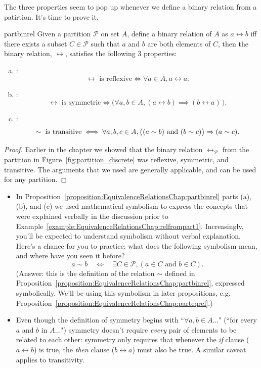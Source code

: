 The three properties seem to pop up whenever we define a binary relation from a patirtion. It's time to prove it.

\begin{prop}{partbinrel} Given a partition $\mathcal{P}$ on set $A$, define a binary relation of $A$ as $a \rel b$ iff there exists a subset $C \in \mathcal{P}$ such that $a$ and $b$ are both elements of $C$, then the binary relation, $\rel$, satisfies the following 3 properties:
\begin{enumerate}[(a)]
\item {}:
	$$ \rel \text{ is reflexive} \iff \forall a \in A, a \rel a .$$
\item  {}:
	$$ \rel \text{ is symmetric} \iff \bigl( \forall a,b \in A,  (a \rel b) \implies (b \rel a)\, \bigr)  .$$
\item  {}:
	$$ \sim \text{ is transitive} \iff  \forall a,b,c \in A,  \bigl( (a \sim b) \mbox{ and } (b \sim c) \bigr) \Rightarrow (a \sim c)  .$$
\end{enumerate}
\end{prop}

\begin{proof}
Earlier in the chapter we showed that the binary relation $\rel_\mathcal{P}$ from the partition in Figure~\ref{fig:partition_discrete} was reflexive, symmetric, and transitive. The arguments that we used are generally applicable, and can be used for any partition.
\end{proof}

\begin{rem} 
\begin{itemize}
\item In Proposition~\ref{proposition:EquivalenceRelationsChap:partbinrel} parts (a),(b), and (c) we used mathematical symbolism to express the concepts that were explained verbally in the discussion prior to Example~\ref{example:EquivalenceRelationsChap:relfrompart1}. Increasingly, you'll be expected to understand symbolism without verbal explanation. Here's a chance for you to practice: what does the following symbolism mean, and where have you seen it before? 
\[ a \sim b \quad \iff \quad \exists C \in \mathcal{P}, ( a \in C \text{ and } b \in C ) .\]
(Answer: this is the definition of  the relation $\sim$  defined in Proposition~\ref{proposition:EquivalenceRelationsChap:partbinrel}, expressed symbolically.
We'll be using this symbolism in later propositions, e.g. Proposition~\ref{proposition:EquivalenceRelationsChap:parteqrel}.) 

\item Even though the definition of symmetry begins with ``$\forall a,b \in A \ldots$" (``for every $a$ and $b$ in $A \ldots$") symmetry doesn't require \emph{every} pair of elements to be related to each other: symmetry only requires that whenever the \emph{if} clause ($a \rel b$) is true, the \emph{then} clause ($b \rel a$) must also be true. A similar caveat applies to transitivity.
\end{itemize}
\end{rem}

